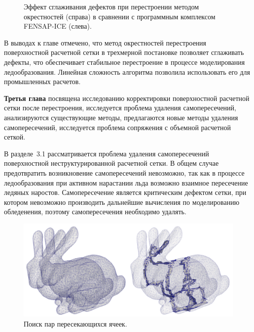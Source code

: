 \documentclass[a4paper,14pt]{extarticle}                     %
\theoremstyle{plain}                                         %
\begin{document}
\begin{figure}[!ht]
\begin{tabular}{ll}
\end{tabular}
\singlespacing
\caption{Эффект сглаживания дефектов при перестроении методом окрестностей (справа) в сравнении с программным комплексом FENSAP-ICE (слева).}
\label{fig:text_1_remesh3_with_fensap}
\end{figure}

В выводах к главе отмечено, что метод окрестностей перестроения поверхностной расчетной сетки в трехмерной постановке позволяет сглаживать дефекты, что обеспечивает стабильное перестроение в процессе моделирования ледообразования.
Линейная сложность алгоритма позволила использовать его для промышленных расчетов.


\textbf{Третья глава} посвящена исследованию корректировки поверхностной расчетной сетки после перестроения, исследуется проблема удаления самопересечений, анализируются существующие методы, предлагаются новые методы удаления самопересечений, исследуется проблема сопряжения с объемной расчетной сеткой.

В разделе~3.1 рассматривается проблема удаления самопересечений поверхностной неструктурированной расчетной сетки.
В общем случае предотвратить возникновение самопересечений невозможно, так как в процессе ледообразования при активном нарастании льда возможно взаимное пересечение ледяных наростов.
Самопересечение является критическим дефектом сетки, при котором невозможно производить дальнейшие вычисления по моделированию обледенения, поэтому самопересечения необходимо удалять.

\begin{figure}[!ht]
\centering
\includegraphics[width=1.0\textwidth]{fig/int_bunnies_dbl.png}
\singlespacing
\caption{Поиск пар пересекающихся ячеек.}
\label{fig:text_1_int_1}
\end{figure}
\end{document}
